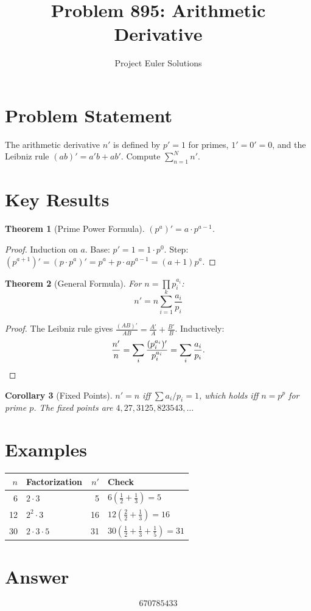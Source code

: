 \documentclass[11pt]{article}
\title{Problem 895: Arithmetic Derivative}
\author{Project Euler Solutions}
\date{}
\newtheorem{theorem}{Theorem}
\newtheorem{corollary}[theorem]{Corollary}
\begin{document}
\maketitle

\section{Problem Statement}
The arithmetic derivative $n'$ is defined by $p'=1$ for primes, $1'=0'=0$, and the Leibniz rule $(ab)' = a'b + ab'$. Compute $\sum_{n=1}^{N} n'$.

\section{Key Results}

\begin{theorem}[Prime Power Formula]
$(p^a)' = a \cdot p^{a-1}$.
\end{theorem}

\begin{proof}
Induction on $a$. Base: $p' = 1 = 1 \cdot p^0$. Step:
$(p^{a+1})' = (p \cdot p^a)' = p^a + p \cdot a p^{a-1} = (a+1)p^a$.
\end{proof}

\begin{theorem}[General Formula]
For $n = \prod p_i^{a_i}$:
\[
n' = n \sum_{i=1}^{k} \frac{a_i}{p_i}
\]
\end{theorem}

\begin{proof}
The Leibniz rule gives $\frac{(AB)'}{AB} = \frac{A'}{A} + \frac{B'}{B}$. Inductively:
\[
\frac{n'}{n} = \sum_i \frac{(p_i^{a_i})'}{p_i^{a_i}} = \sum_i \frac{a_i}{p_i}. \qedhere
\]
\end{proof}

\begin{corollary}[Fixed Points]
$n' = n$ iff $\sum a_i/p_i = 1$, which holds iff $n = p^p$ for prime $p$. The fixed points are $4, 27, 3125, 823543, \ldots$
\end{corollary}

\section{Examples}
\begin{center}
\begin{tabular}{r|l|r|l}
$n$ & Factorization & $n'$ & Check \\ \hline
6 & $2 \cdot 3$ & 5 & $6(\tfrac{1}{2}+\tfrac{1}{3}) = 5$ \\
12 & $2^2 \cdot 3$ & 16 & $12(\tfrac{2}{2}+\tfrac{1}{3}) = 16$ \\
30 & $2\cdot 3\cdot 5$ & 31 & $30(\tfrac{1}{2}+\tfrac{1}{3}+\tfrac{1}{5})=31$
\end{tabular}
\end{center}

\section{Answer}

\[
\boxed{670785433}
\]
\end{document}
